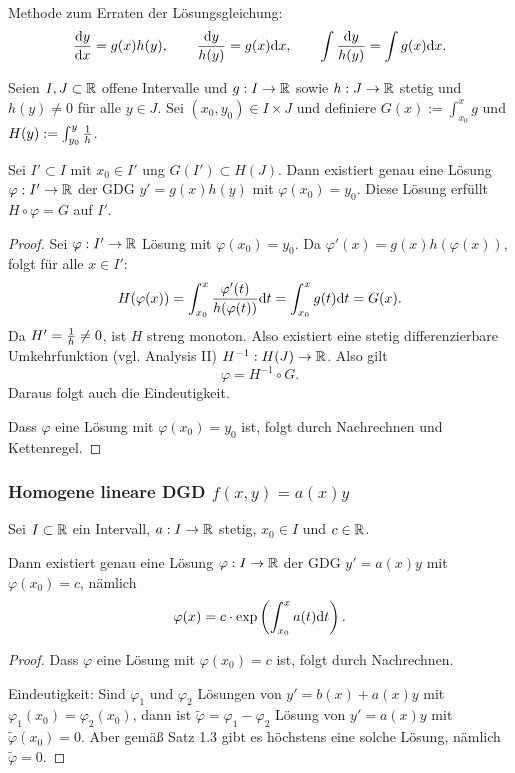 Methode zum Erraten der Lösungsgleichung:
\[ \frac{\mathrm{d} y}{\mathrm{d} x} = g(x) h(y), \qquad \frac{\mathrm{d} y}{h(y)} = g(x) \mathrm{d} x,
  \qquad \int \frac{\mathrm{d} y}{h(y)} = \int g(x) \mathrm{d} x. \]

\begin{thm}
  Seien $I,J \subset \mathbb{R}$ offene Intervalle und $g:I \to \mathbb{R}$ sowie $h:J \to
  \mathbb{R}$ stetig und $h(y) \ne 0$ für alle $y \in J$. Sei $(x_0, y_0) \in I
  \times J$ und definiere $G(x) := \int_{x_0}^x g$ und $H(y) := \int_{y_0}^y
  \frac{1}{h}$.

  Sei $I' \subset I$ mit $x_0 \in I'$ ung $G(I') \subset H(J)$. Dann existiert
  genau eine Lösung $\varphi: I' \to \mathbb{R}$ der GDG $y' = g(x) h(y)$ mit
  $\varphi(x_0)=y_0$. Diese Lösung erfüllt $H \circ \varphi = G$ auf $I'$.
\end{thm}

\begin{proof}
  Sei $\varphi:I' \to \mathbb{R}$ Lösung mit $\varphi(x_0) = y_0$. Da $\varphi'(x) =
  g(x) h(\varphi(x))$, folgt für alle $x \in I'$: 
  \[ H(\varphi(x)) = \int_{x_0}^x \frac{\varphi'(t)}{h(\varphi(t))} \mathrm{d} t =
    \int_{x_0}^x g(t) \mathrm{d} t = G(x). \] 
  Da $H' = \frac{1}{h} \ne 0$, ist $H$ streng monoton. Also existiert eine stetig
  differenzierbare Umkehrfunktion (vgl. Analysis II) $H^{-1}:H(J) \to \mathbb{R}$.
  Also gilt
  \[ \varphi = H^{-1} \circ G. \]
  Daraus folgt auch die Eindeutigkeit.

  Dass $\varphi$ eine Lösung mit $\varphi(x_0) = y_0$ ist, folgt durch
  Nachrechnen und Kettenregel.
\end{proof}

\subsubsection{Homogene lineare DGD
  \texorpdfstring{$f(x,y)=a(x)y$}{f(x,y)=a(x)y}}
\begin{thm}
  Sei $I \subset \mathbb{R}$ ein Intervall, $a:I \to \mathbb{R}$ stetig, $x_0 \in I$ und
  $c \in \mathbb{R}$.

  Dann existiert genau eine Lösung $\varphi:I \to \mathbb{R}$ der GDG $y' = a(x) y$
  mit $\varphi(x_0) = c$, nämlich
  \[ \varphi(x) = c \cdot \exp \left( \int_{x_0}^x a(t) \mathrm{d} t  \right). \]
\end{thm}

\begin{proof}
  Dass $\varphi$ eine Lösung mit $\varphi(x_0) = c$ ist, folgt durch
  Nachrechnen.

  Eindeutigkeit: Sind $\varphi_1$ und $\varphi_2$ Lösungen von $y'=b(x)+a(x)y$
  mit $\varphi_1(x_0) = \varphi_2(x_0)$, dann ist
  $\tilde{\varphi}=\varphi_1-\varphi_2$ Lösung von $y'=a(x)y$ mit
  $\tilde{\varphi}(x_0) = 0$. Aber gemäß Satz 1.3 gibt es höchstens eine solche
  Lösung, nämlich $\tilde{\varphi} = 0$.
\end{proof}

